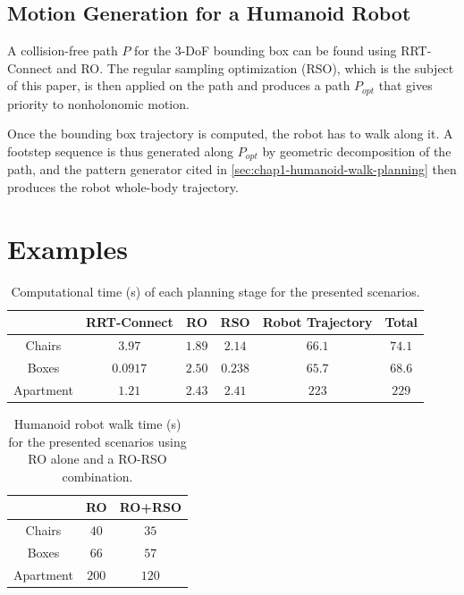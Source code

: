 \subsection{Motion Generation for a Humanoid Robot}

A collision-free path $P$ for the 3-DoF bounding box can be found
using RRT-Connect and RO. The regular sampling optimization (RSO),
which is the subject of this paper, is then applied on the path and
produces a path $P_{opt}$ that gives priority to nonholonomic motion.

Once the bounding box trajectory is computed, the robot has to walk
along it. A footstep sequence is thus generated along $P_{opt}$ by
geometric decomposition of the path, and the pattern generator cited
in \autoref{sec:chap1-humanoid-walk-planning} then produces the robot
whole-body trajectory.

\section{Examples}
\label{sec:chap1-examples}

\begin{table}
\centering
\begin{tabular}{c|c|c|c|c|c|}
  \cline{2-6}
  & RRT-Connect & RO & RSO & Robot Trajectory & Total\\
  \hline
  \multicolumn{1}{|c|}{Chairs} & $3.97$ & $1.89$ & $2.14$ & $66.1$ & $74.1$\\
  \hline
  \multicolumn{1}{|c|}{Boxes} & $0.0917$ & $2.50$ & $0.238$ & $65.7$ & $68.6$\\
  \hline
  \multicolumn{1}{|c|}{Apartment} & $1.21$ & $2.43$ & $2.41$ & $223$ & $229$ \\
  \hline
\end{tabular}
\caption{Computational time (s) of each planning stage for the
  presented scenarios.}
\label{tab:chap1-computation-time}
\end{table}

\begin{table}
\centering
\begin{tabular}{c|c|c|}
  \cline{2-3}
  & RO & RO+RSO \\
  \hline
  \multicolumn{1}{|c|}{Chairs} & $40$ & $35$ \\
  \hline
  \multicolumn{1}{|c|}{Boxes} & $66$ & $57$ \\
  \hline
  \multicolumn{1}{|c|}{Apartment} & $200$ & $120$ \\
  \hline
\end{tabular}
\caption{Humanoid robot walk time (s) for the presented scenarios
  using RO alone and a RO-RSO combination.}
\label{tab:chap1-walk-time}
\end{table}

